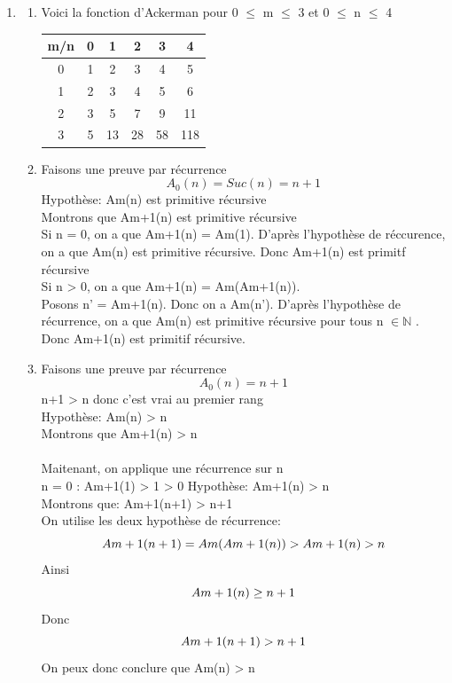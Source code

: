 \documentclass[]{article}
\begin{document}
\begin{enumerate}
\begin{enumerate}
\end{enumerate}
\item \begin{enumerate} 

\item Voici la fonction d'Ackerman pour 0 $\le$ m $\le$ 3 et 0 $\le$ n $\le$ 4 \\
\begin{center}
\begin{tabular}{| c || c | c | c | c | c |}
\hline
m/n & 0 & 1 & 2 & 3 & 4 \\
\hline
\hline
0 & 1 & 2 & 3 & 4 & 5 \\
\hline
1 & 2 & 3 & 4 & 5 & 6 \\
\hline
2 & 3 & 5 & 7 & 9 & 11 \\
\hline
3 & 5 & 13 & 28 & 58 & 118 \\
\hline
\end{tabular}
\end{center}

\item Faisons une preuve par récurrence
\[A_0(n) = Suc(n) = n + 1\]
Hypothèse: A\tiny m\normalsize (n) est primitive récursive\\
Montrons que A\tiny m+1\normalsize (n) est primitive récursive\\ 

Si n = 0, on a que A\tiny m+1\normalsize (n) = A\tiny m\normalsize (1). D'après l'hypothèse de réccurence, on a que A\tiny m\normalsize (n) est primitive récursive. Donc A\tiny m+1\normalsize (n) est primitf récursive\\

Si n > 0, on a que A\tiny m+1\normalsize (n) = A\tiny m\normalsize (A\tiny m+1\normalsize (n)).\\
Posons n' = A\tiny m+1\normalsize (n). Donc on a A\tiny m\normalsize (n'). D'après l'hypothèse de récurrence, on a que A\tiny m\normalsize (n) est primitive récursive pour tous n $\in \mathbb{N}$ . Donc A\tiny m+1\normalsize (n) est primitif récursive.\\

\item 
Faisons une preuve par récurrence 
\[A_0(n) = n+1 \] 
n+1 > n donc c'est vrai au premier rang\\
Hypothèse: A\tiny m\normalsize (n) > n \\
Montrons que A\tiny m+1\normalsize (n) > n\\ \\
Maitenant, on applique une récurrence sur n\\
n = 0 : A\tiny m+1\normalsize (1) > 1  > 0
Hypothèse: A\tiny m+1\normalsize (n) > n \\
Montrons que: A\tiny m+1\normalsize (n+1) > n+1\\
On utilise les deux hypothèse de récurrence:\\
\[A\tiny m+1\normalsize (n+1) = A\tiny m\normalsize (A\tiny m+1\normalsize (n)) > A\tiny m+1\normalsize (n) > n \]
Ainsi \[A\tiny m+1\normalsize (n) \ge n+1\]
Donc \[A\tiny m+1\normalsize (n+1) > n+1\]
On peux donc conclure que A\tiny m\normalsize (n) > n\\


\end{enumerate}
\end{enumerate}
\end{document}
